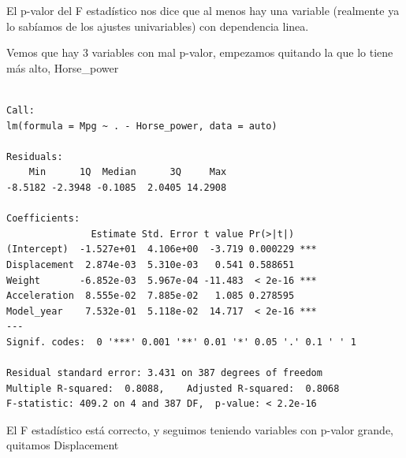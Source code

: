\documentclass[
]{article}
\newenvironment{Shaded}{\begin{snugshade}}{\end{snugshade}}
\newcommand{\DataTypeTok}[1]{\textcolor[rgb]{0.13,0.29,0.53}{#1}}
\newcommand{\KeywordTok}[1]{\textcolor[rgb]{0.13,0.29,0.53}{\textbf{#1}}}
\newcommand{\NormalTok}[1]{#1}
\newcommand{\OperatorTok}[1]{\textcolor[rgb]{0.81,0.36,0.00}{\textbf{#1}}}
\newcommand{\StringTok}[1]{\textcolor[rgb]{0.31,0.60,0.02}{#1}}
\begin{document}
El p-valor del F estadístico nos dice que al menos hay una variable
(realmente ya lo sabíamos de los ajustes univariables) con dependencia
linea.

Vemos que hay 3 variables con mal p-valor, empezamos quitando la que lo
tiene más alto, Horse\_power

\begin{Shaded}
\end{Shaded}

\begin{verbatim}

Call:
lm(formula = Mpg ~ . - Horse_power, data = auto)

Residuals:
    Min      1Q  Median      3Q     Max 
-8.5182 -2.3948 -0.1085  2.0405 14.2908 

Coefficients:
               Estimate Std. Error t value Pr(>|t|)    
(Intercept)  -1.527e+01  4.106e+00  -3.719 0.000229 ***
Displacement  2.874e-03  5.310e-03   0.541 0.588651    
Weight       -6.852e-03  5.967e-04 -11.483  < 2e-16 ***
Acceleration  8.555e-02  7.885e-02   1.085 0.278595    
Model_year    7.532e-01  5.118e-02  14.717  < 2e-16 ***
---
Signif. codes:  0 '***' 0.001 '**' 0.01 '*' 0.05 '.' 0.1 ' ' 1

Residual standard error: 3.431 on 387 degrees of freedom
Multiple R-squared:  0.8088,    Adjusted R-squared:  0.8068 
F-statistic: 409.2 on 4 and 387 DF,  p-value: < 2.2e-16
\end{verbatim}

El F estadístico está correcto, y seguimos teniendo variables con
p-valor grande, quitamos Displacement

\begin{Shaded}
\end{Shaded}
\end{document}
